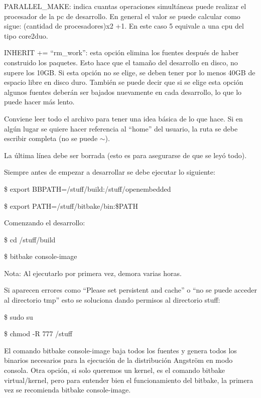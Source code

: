 \bigskip
PARALLEL\_MAKE: indica cuantas operaciones simultáneas puede realizar el procesador de la pc de desarrollo. En general el valor se puede calcular como sigue: (cantidad de procesadores)x2 +1. En este caso 5 equivale a una cpu del tipo core2duo.

\bigskip
INHERIT += “rm\_work”: esta opción elimina los fuentes después de haber construido los paquetes. Esto hace que el tamaño del desarrollo en disco, no supere los 10GB. Si esta opción no se elige, se deben tener por lo menos 40GB de espacio libre en disco duro. También se puede decir que si se elige esta opción algunos fuentes deberán ser bajados nuevamente en cada desarrollo, lo que lo puede hacer más lento.


\bigskip
Conviene leer todo el archivo para tener una idea básica de lo que hace. Si en algún lugar se quiere hacer referencia al “home” del usuario, la ruta se debe escribir completa (no se puede $\sim$).

La última línea debe ser borrada (esto es para asegurarse de que se leyó todo). 

\bigskip
{}

\bigskip
Siempre antes de empezar a desarrollar se debe ejecutar lo siguiente:

\bigskip
\centerline{\$ export BBPATH=/stuff/build:/stuff/openembedded}

\centerline{\$ export PATH=/stuff/bitbake/bin:\$PATH}

\bigskip
Comenzando el desarrollo:

\bigskip
\centerline{\$ cd /stuff/build}

\centerline{\$ bitbake console-image}

\bigskip
Nota: Al ejecutarlo por primera vez, demora varias horas. 

\bigskip
Si aparecen errores como “Please set persistent and cache” o “no se puede acceder al directorio tmp” esto se soluciona dando permisos al directorio stuff:

\bigskip
\centerline{\$ sudo su}

\centerline{\$ chmod -R 777 /stuff}

\bigskip
El comando bitbake console-image baja todos los fuentes y genera todos los binarios necesarios para la ejecución de la  distribución Angström en modo consola. Otra opción, si solo queremos un kernel, es el comando bitbake virtual/kernel, pero para entender bien el funcionamiento del bitbake, la primera vez se recomienda bitbake console-image.

